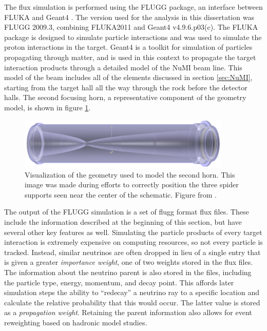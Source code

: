 The flux simulation is performed using the FLUGG package, an interface between FLUKA \cite{ref:Fluka1, ref:Fluka2} and Geant4 \cite{ref:Geant41, ref:Geant42}. The version used for the analysis in this dissertation was FLUGG 2009.3, combining FLUKA2011 and Geant4 v4.9.6.p03(c). The FLUKA package is designed to simulate particle interactions and was used to simulate the proton interactions in the target. Geant4 is a toolkit for simulation of particles propagating through matter, and is used in this context to propagate the target interaction products through a detailed model of the NuMI beam line. This model of the beam includes all of the elements discussed in section \ref{sec:NuMI}, starting from the target hall all the way through the rock before the detector halls. The second focusing horn, a representative component of the geometry model, is shown in figure \ref{fig:GeomHorn}.
\begin{figure}[htb]
  \centering
  \includegraphics[width=0.9\textwidth]{figures/Horn2.png}
  \caption[Model of the Second Focusing Horn]{Visualization of the geometry used to model the second horn. This image was made during efforts to correctly position the three spider supports seen near the center of the schematic. Figure from \cite{ref:GeomNuMI}.}
  \label{fig:GeomHorn}
\end{figure}

The output of the FLUGG simulation is a set of flugg format flux files. These include the information described at the beginning of this section, but have several other key features as well. Simulating the particle products of every target interaction is extremely expensive on computing resources, so not every particle is tracked. Instead, similar neutrinos are often dropped in lieu of a single entry that is given a greater {\em importance weight}, one of two weights stored in the flux files. The information about the neutrino parent is also stored in the files, including the particle type, energy, momentum, and decay point. This affords later simulation steps the ability to ``redecay'' a neutrino ray to a specific location and calculate the relative probability that this would occur. The latter value is stored as a {\em propagation weight}. Retaining the parent information also allows for event reweighting based on hadronic model studies.

